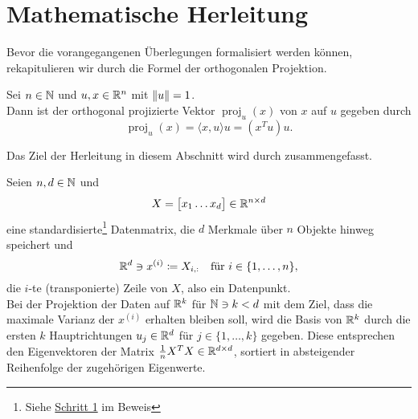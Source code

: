 \section{Mathematische Herleitung}
Bevor die vorangegangenen Überlegungen formalisiert werden können, rekapitulieren wir durch  die Formel der orthogonalen Projektion.
\begin{repitition}\label{rep:proj}
    Sei \(n \in \mathbb{N}\) und \(u,x \in \mathbb{R}^{n}\) mit \(\lVert u\rVert = 1\).  \\
    Dann ist der orthogonal projizierte Vektor \(\operatorname{proj}_{u}(x)\) von \(x\) auf \(u\) gegeben durch
    \begin{equation*}
        \operatorname{proj}_{u}(x) = \langle x,u \rangle u = (x^{T}u)u.
    \end{equation*}     
\end{repitition}
Das Ziel der Herleitung in diesem Abschnitt wird durch  zusammengefasst.
\begin{application}[PCA]\label{app:pca}
    Seien \(n,d \in \mathbb{N}\) und  
    \begin{equation*}
        X = 
        \big[
            \begin{matrix}
                x_1 \dots x_d
            \end{matrix}    
        \big] \in \mathbb{R}^{n \times d}
    \end{equation*} 
    eine standardisierte\footnote{Siehe \hyperref[itm:pca1]{Schritt 1} im Beweis} Datenmatrix, die \(d\) Merkmale über \(n\) Objekte hinweg speichert und
    \begin{equation*}
        \mathbb{R}^{d} \ni x^{(i)} \coloneqq X_{i,:} \quad \text{für } i \in \{1,\ldots,n\},
    \end{equation*}
    die \(i\)-te (transponierte) Zeile von \(X\), also ein Datenpunkt.     \\
    Bei der Projektion der Daten auf \(\mathbb{R}^{k}\) für \(\mathbb{N} \ni k < d\) mit dem Ziel, dass die maximale Varianz der \(x^{(i)}\) erhalten bleiben soll, wird die Basis von \(\mathbb{R}^{k}\)  durch die ersten \(k\) Hauptrichtungen \(u_{j} \in \mathbb{R}^{d}\) für \(j \in \{1,\ldots,k\}\) gegeben.
    Diese entsprechen den Eigenvektoren der Matrix \(\frac{1}{n}X^{T}X \in \mathbb{R}^{d \times d}\), sortiert in absteigender Reihenfolge der zugehörigen Eigenwerte.
\end{application}
